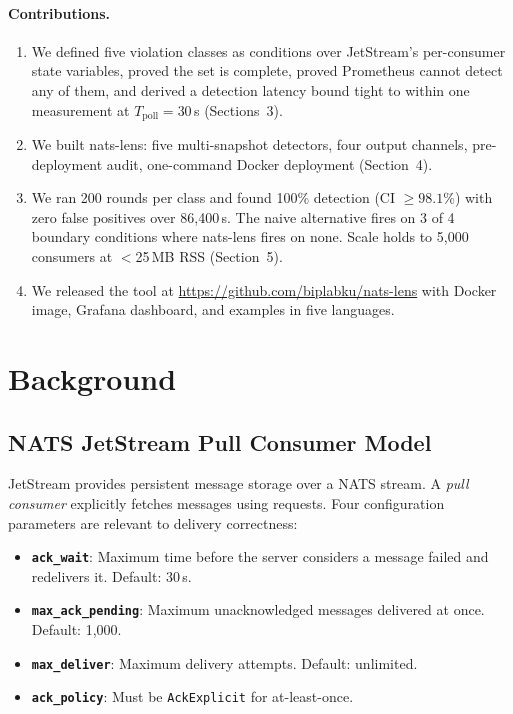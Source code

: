 \documentclass[sigconf,nonacm]{acmart}
\begin{document}
\paragraph{Contributions.}
\begin{enumerate}
\item We defined five violation classes as conditions over JetStream's
  per-consumer state variables, proved the set is complete, proved
  Prometheus cannot detect any of them, and derived a detection latency
  bound tight to within one measurement at $T_\mathrm{poll}{=}30$\,s
  (Sections~3).
\item We built nats-lens: five multi-snapshot detectors, four output
  channels, pre-deployment audit, one-command Docker deployment (Section~4).
\item We ran 200 rounds per class and found 100\% detection
  (CI $\geq 98.1\%$) with zero false positives over 86,400\,s. The naive
  alternative fires on 3 of 4 boundary conditions where nats-lens fires
  on none. Scale holds to 5{,}000 consumers at $<$25\,MB RSS (Section~5).
\item We released the tool at \url{https://github.com/biplabku/nats-lens}
  with Docker image, Grafana dashboard, and examples in five languages.
\end{enumerate}

\section{Background}

\subsection{NATS JetStream Pull Consumer Model}

JetStream provides persistent message storage over a NATS stream. A
\emph{pull consumer} explicitly fetches messages using
 requests. Four configuration parameters
are relevant to delivery correctness:

\begin{itemize}
\item \textbf{\texttt{ack\_wait}}: Maximum time before the server considers
  a message failed and redelivers it. Default: 30\,s.
\item \textbf{\texttt{max\_ack\_pending}}: Maximum unacknowledged messages
  delivered at once. Default: 1{,}000.
\item \textbf{\texttt{max\_deliver}}: Maximum delivery attempts. Default: unlimited.
\item \textbf{\texttt{ack\_policy}}: Must be \texttt{AckExplicit} for at-least-once.
\end{itemize}
\end{document}
